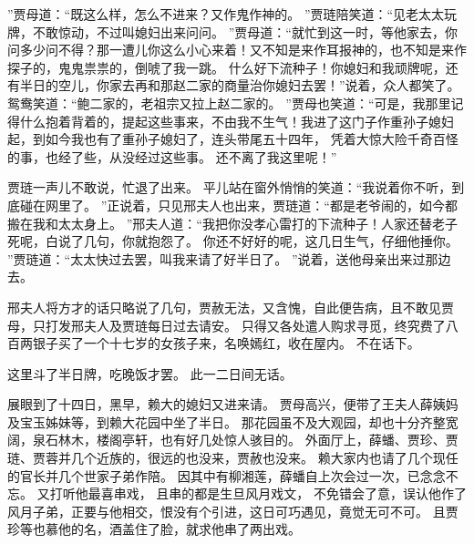 ”贾母道：“既这么样，怎么不进来？又作鬼作神的。
”贾琏陪笑道：“见老太太玩牌，不敢惊动，不过叫媳妇出来问问。
”贾母道：“就忙到这一时，等他家去，你问多少问不得？那一遭儿你这么小心来着！又不知是来作耳报神的，也不知是来作探子的，鬼鬼祟祟的，倒唬了我一跳。
什么好下流种子！你媳妇和我顽牌呢，还有半日的空儿，你家去再和那赵二家的商量治你媳妇去罢！”说着，众人都笑了。
鸳鸯笑道：“鲍二家的，老祖宗又拉上赵二家的。
”贾母也笑道：“可是，我那里记得什么抱着背着的，提起这些事来，不由我不生气！我进了这门子作重孙子媳妇起，到如今我也有了重孙子媳妇了，连头带尾五十四年，
凭着大惊大险千奇百怪的事，也经了些，从没经过这些事。
还不离了我这里呢！”\par
贾琏一声儿不敢说，忙退了出来。
平儿站在窗外悄悄的笑道：“我说着你不听，到底碰在网里了。
”正说着，只见邢夫人也出来，贾琏道：“都是老爷闹的，如今都搬在我和太太身上。
”邢夫人道：“我把你没孝心雷打的下流种子！人家还替老子死呢，白说了几句，你就抱怨了。
你还不好好的呢，这几日生气，仔细他捶你。
”贾琏道：“太太快过去罢，叫我来请了好半日了。
”说着，送他母亲出来过那边去。
\par
邢夫人将方才的话只略说了几句，贾赦无法，又含愧，自此便告病，且不敢见贾母，只打发邢夫人及贾琏每日过去请安。
只得又各处遣人购求寻觅，终究费了八百两银子买了一个十七岁的女孩子来，名唤嫣红，收在屋内。
不在话下。
\par
这里斗了半日牌，吃晚饭才罢。
此一二日间无话。
\par
展眼到了十四日，黑早，赖大的媳妇又进来请。
贾母高兴，便带了王夫人薛姨妈及宝玉姊妹等，到赖大花园中坐了半日。
那花园虽不及大观园，却也十分齐整宽阔，泉石林木，楼阁亭轩，也有好几处惊人骇目的。
外面厅上，薛蟠、贾珍、贾琏、贾蓉并几个近族的，很远的也没来，贾赦也没来。
赖大家内也请了几个现任的官长并几个世家子弟作陪。
因其中有柳湘莲，薛蟠自上次会过一次，已念念不忘。
又打听他最喜串戏，
且串的都是生旦风月戏文，
不免错会了意，误认他作了风月子弟，正要与他相交，恨没有个引进，这日可巧遇见，竟觉无可不可。
且贾珍等也慕他的名，酒盖住了脸，就求他串了两出戏。
